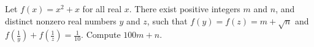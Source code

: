 Let $f(x)=x^2+x$ for all real $x$. There exist positive integers $m$ and $n$, and distinct nonzero real numbers $y$ and $z$, such that $f(y)=f(z)=m+\sqrt{n}$ and $f(\frac{1}{y})+f(\frac{1}{z})=\frac{1}{10}$. Compute $100m+n$.
